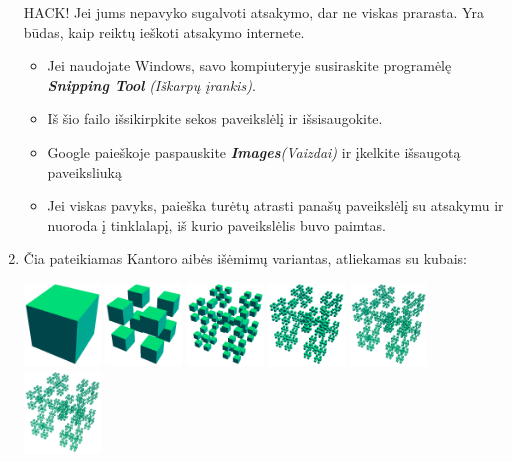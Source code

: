 \documentclass[a4paper]{article}
\renewenvironment{framed}[1][\hsize]
   {\MakeFramed{\hsize#1\advance\hsize-\width \FrameRestore}}%
   {\endMakeFramed}
\newcommand{\say}[1]{\textbf{\textit{#1}}}
\begin{document}
\begin{enumerate}
\begin{framed}
HACK! Jei jums nepavyko sugalvoti atsakymo, dar ne viskas prarasta. Yra būdas, kaip reiktų ieškoti atsakymo internete.
\begin{itemize}
\item Jei naudojate Windows, savo kompiuteryje susiraskite programėlę \say{Snipping Tool} \textit{(Iškarpų įrankis)}.
\item Iš šio failo išsikirpkite sekos paveikslėlį ir išsisaugokite.
\item Google paieškoje paspauskite \say{Images}\textit{(Vaizdai)} ir įkelkite išsaugotą paveiksliuką
\item Jei viskas pavyks, paieška turėtų atrasti panašų paveikslėlį su atsakymu ir nuoroda į tinklalapį, iš kurio paveikslėlis buvo paimtas.
\end{itemize}
\end{framed}

\item Čia pateikiamas Kantoro aibės išėmimų variantas, atliekamas su kubais:

\includegraphics[width=0.16\textwidth]{cantor1.png}
\includegraphics[width=0.16\textwidth]{cantor2.png}
\includegraphics[width=0.16\textwidth]{cantor3.png}
\includegraphics[width=0.16\textwidth]{cantor4.png}
\includegraphics[width=0.16\textwidth]{cantor5.png}
\includegraphics[width=0.16\textwidth]{cantor6.png}


\end{enumerate}
\end{document}
